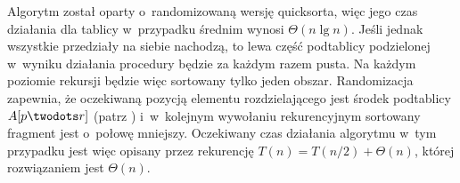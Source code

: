 \subproblem %
Algorytm został oparty o~randomizowaną wersję quicksorta, więc jego czas działania dla tablicy  w~przypadku średnim wynosi $\Theta(n\lg n)$.
Jeśli jednak wszystkie przedziały na siebie nachodzą, to lewa część podtablicy podzielonej w~wyniku działania procedury  będzie za każdym razem pusta.
Na każdym poziomie rekursji będzie więc sortowany tylko jeden obszar.
Randomizacja zapewnia, że oczekiwaną pozycją elementu rozdzielającego jest środek podtablicy $A[p\twodots r]$ (patrz ) i~w~kolejnym wywołaniu rekurencyjnym sortowany fragment jest o~połowę mniejszy.
Oczekiwany czas działania algorytmu w~tym przypadku jest więc opisany przez rekurencję $T(n)=T(n/2)+\Theta(n)$, której rozwiązaniem jest $\Theta(n)$.
